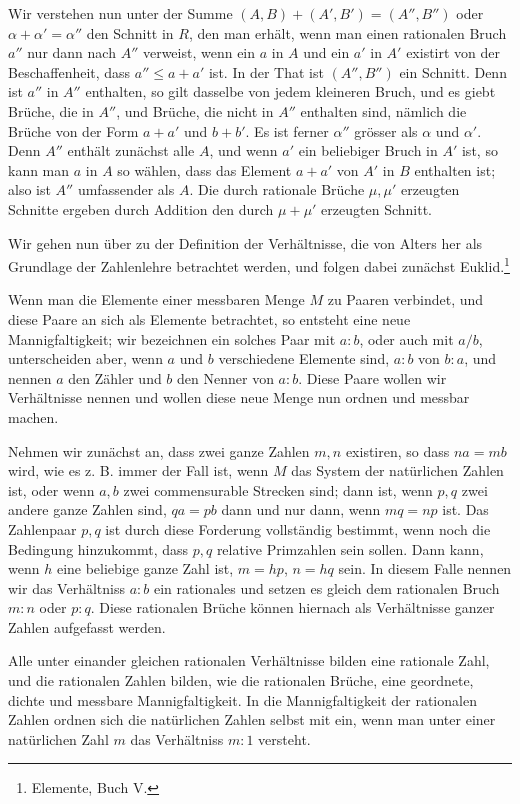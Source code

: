 \documentclass[11pt]{article}
\begin{document}
Wir verstehen nun unter der Summe $(A,B)+(A',B')=(A'',B'')$ oder $\alpha+\alpha'=\alpha''$ den Schnitt in $R$, den man erhält, wenn man einen rationalen Bruch $a''$ nur dann nach $A''$ verweist, wenn ein $a$ in $A$ und ein $a'$ in $A'$ existirt von der Beschaffenheit, dass $a''\le a+a'$ ist. In der That ist $(A'',B'')$ ein Schnitt. Denn ist $a''$ in $A''$ enthalten, so gilt dasselbe von jedem kleineren Bruch, und es giebt Brüche, die in $A''$, und Brüche, die nicht in $A''$ enthalten sind, nämlich die Brüche von der Form $a+a'$ und $b+b'$. Es ist ferner $\alpha''$ grösser als $\alpha$ und $\alpha'$. Denn $A''$ enthält zunächst alle $A$, und wenn $a'$ ein beliebiger Bruch in $A'$ ist, so kann man $a$ in $A$ so wählen, dass das Element $a+a'$ von $A'$ in $B$ enthalten ist; also ist $A''$ umfassender als $A$. Die durch rationale Brüche $\mu,\mu'$ erzeugten Schnitte ergeben durch Addition den durch $\mu+\mu'$ erzeugten Schnitt.

Wir gehen nun über zu der Definition der Verhältnisse, die von Alters her als Grundlage der Zahlenlehre betrachtet werden, und folgen dabei zunächst Euklid.\footnote{Elemente, Buch V.}

Wenn man die Elemente einer messbaren Menge $M$ zu Paaren verbindet, und diese Paare an sich als Elemente betrachtet, so entsteht eine neue Mannigfaltigkeit; wir bezeichnen ein solches Paar mit $a:b$, oder auch mit $a/b$, unterscheiden aber, wenn $a$ und $b$ verschiedene Elemente sind, $a:b$ von $b:a$, und nennen $a$ den Zähler und $b$ den Nenner von $a:b$. Diese Paare wollen wir Verhältnisse nennen und wollen diese neue Menge nun ordnen und messbar machen.

Nehmen wir zunächst an, dass zwei ganze Zahlen $m,n$ existiren, so dass $na=mb$ wird, wie es z. B. immer der Fall ist, wenn $M$ das System der natürlichen Zahlen ist, oder wenn $a,b$ zwei commensurable Strecken sind; dann ist, wenn $p,q$ zwei andere ganze Zahlen sind, $qa=pb$ dann und nur dann, wenn $mq=np$ ist. Das Zahlenpaar $p,q$ ist durch diese Forderung vollständig bestimmt, wenn noch die Bedingung hinzukommt, dass $p,q$ relative Primzahlen sein sollen. Dann kann, wenn $h$ eine beliebige ganze Zahl ist, $m=hp$, $n=hq$ sein. In diesem Falle nennen wir das Verhältniss $a:b$ ein rationales und setzen es gleich dem rationalen Bruch $m:n$ oder $p:q$. Diese rationalen Brüche können hiernach als Verhältnisse ganzer Zahlen aufgefasst werden.

Alle unter einander gleichen rationalen Verhältnisse bilden eine rationale Zahl, und die rationalen Zahlen bilden, wie die rationalen Brüche, eine geordnete, dichte und messbare Mannigfaltigkeit. In die Mannigfaltigkeit der rationalen Zahlen ordnen sich die natürlichen Zahlen selbst mit ein, wenn man unter einer natürlichen Zahl $m$ das Verhältniss $m:1$ versteht.
\end{document}
